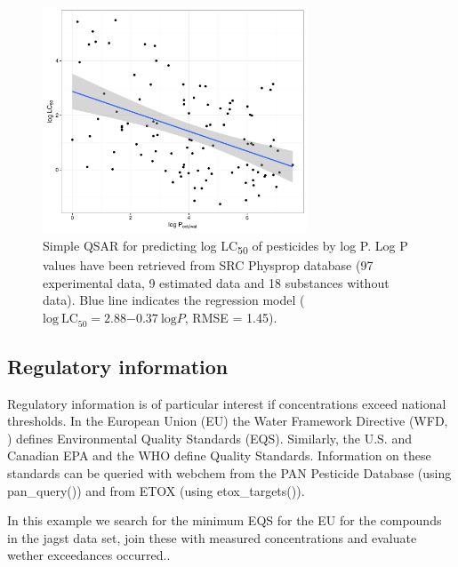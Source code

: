 \begin{figure}[h]
\begin{knitrout}
\color{fgcolor}

{\centering \includegraphics[width=0.7\textwidth]{chapters/webchem/plot_qsar-1.pdf} 

}



\end{knitrout}
\caption[Simple QSAR for predicting log LC\textsubscript{50} of pesticides by log P.]{Simple QSAR for predicting log LC\textsubscript{50} of pesticides by log P. 
Log P values have been retrieved from SRC Physprop database (97 experimental data, 9 estimated data and 18 substances without data). 
Blue line indicates the regression model ($\mathrm{log~LC}_{50} = 2.88\ensuremath{-0.37}~\mathrm{log} P$, RMSE = 1.45).}
\label{fig:fig3}
\end{figure}


\subsection[Regulatory information]{Regulatory information}
Regulatory information is of particular interest if concentrations exceed national thresholds.
In the European Union (EU) the Water Framework Directive (WFD, \citet{wfd2000directive}) defines Environmental Quality Standards (EQS).
Similarly, the U.S. and Canadian EPA and the WHO define Quality Standards.
Information on these standards can be queried with webchem from the PAN Pesticide Database (using pan\_query()) and from ETOX (using etox\_targets()).

In this example we search for the minimum EQS for the EU for the compounds in the jagst data set, join these with measured concentrations and evaluate wether exceedances occurred..

